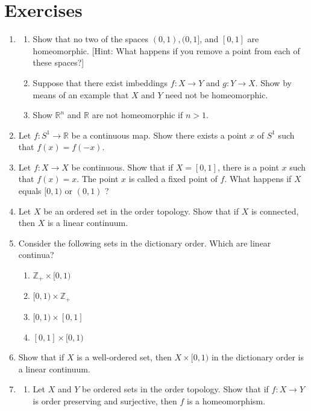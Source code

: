 \section*{Exercises}
\begin{enumerate}[itemsep=0.4em, parsep=0pt, topsep=0pt, partopsep=0pt, leftmargin=*, label=\arabic*., ref=\arabic*]
\item
 \begin{enumerate}[itemsep=0.2em, parsep=0pt, topsep=0pt, partopsep=0pt, leftmargin=*, label=(\alph*), align=left]
 \item Show that no two of the spaces \(( {0,1}),(0,1\rbrack\), and \([ {0,1}]\) are homeomorphic. [Hint: What happens if you remove a point from each of these spaces?]

 \item Suppose that there exist imbeddings \(f : X \rightarrow Y\) and \(g : Y \rightarrow X\). Show by means of an example that \(X\) and \(Y\) need not be homeomorphic.
 \item Show \(\mathbb{R}^{n}\) and \(\mathbb{R}\) are not homeomorphic if \(n > 1\).
 \end{enumerate}
\item Let \(f : S^{1} \rightarrow \mathbb{R}\) be a continuous map. Show there exists a point \(x\) of \(S^{1}\) such that \(f(x) = f( {-x})\).
\item Let \(f : X \rightarrow X\) be continuous. Show that if \(X = [ {0,1}]\), there is a point \(x\) such that \(f(x) = x\). The point \(x\) is called a fixed point of \(f\). What happens if \(X\) equals \(\lbrack 0,1)\) or \(( {0,1})\) ?
\item Let \(X\) be an ordered set in the order topology. Show that if \(X\) is connected, then \(X\) is a linear continuum.
\item Consider the following sets in the dictionary order. Which are linear continua?
 \begin{enumerate}[itemsep=0.2em, parsep=0pt, topsep=0pt, partopsep=0pt, leftmargin=*, label=(\alph*), align=left]
 \item \(\mathbb{Z}_{ + } \times \lbrack 0,1)\)
 \item \(\lbrack 0,1) \times {\mathbb{Z}}_{ + }\)
 \item \(\lbrack 0,1) \times [ {0,1}]\)
 \item \([ {0,1}] \times \lbrack 0,1)\)
 \end{enumerate}
\item Show that if \(X\) is a well-ordered set, then \(X \times \lbrack 0,1)\) in the dictionary order is a linear continuum.
\item
 \begin{enumerate}[itemsep=0.2em, parsep=0pt, topsep=0pt, partopsep=0pt, leftmargin=*, label=(\alph*), align=left]
 \item Let \(X\) and \(Y\) be ordered sets in the order topology. Show that if \(f : X \rightarrow Y\) is order preserving and surjective, then \(f\) is a homeomorphism.


\end{enumerate}
\end{enumerate}
